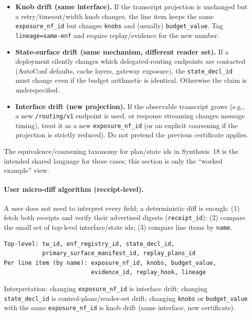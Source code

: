 \documentclass[11pt]{article}
\begin{document}
\begin{itemize}[leftmargin=*]
\item \textbf{Knob drift (same interface).} If the transcript projection is unchanged but a retry/timeout/width knob changes, the line item keeps the same \texttt{exposure\_nf\_id} but changes \texttt{knobs} and (usually) \texttt{budget\_value}. Tag \texttt{lineage=same-enf} and require replay/evidence for the new number.\cite{series:receiptitems,series:planstateequiv}
\item \textbf{State-surface drift (same mechanism, different reader set).} If a deployment silently changes which delegated-routing endpoints are contacted (AutoConf defaults, cache layers, gateway exposure), the \texttt{state\_decl\_id} must change even if the budget arithmetic is identical. Otherwise the claim is underspecified.\cite{series:deployedsurfaces,series:planstateequiv}
\item \textbf{Interface drift (new projection).} If the observable transcript grows (e.g., a new \texttt{/routing/v1} endpoint is used, or response streaming changes message timing), treat it as a new \texttt{exposure\_nf\_id} (or an explicit coarsening if the projection is strictly reduced). Do not pretend the previous certificate applies.\cite{series:traceifaces,series:receiptitems}
\end{itemize}

The equivalence/coarsening taxonomy for plan/state ids in Synthesis~18 is the intended shared language for these cases; this section is only the ``worked example'' view.\cite{series:planstateequiv}

\paragraph{User micro-diff algorithm (receipt-level).}
A user does not need to interpret every field; a deterministic diff is enough:
(1) fetch both receipts and verify their advertised digests (\texttt{receipt\_id});
(2) compare the small set of top-level interface/state ids;
(3) compare line items by \texttt{name}.
\begin{verbatim}
Top-level: tw_id, enf_registry_id, state_decl_id,
           primary_surface_manifest_id, replay_plans_id
Per line item (by name): exposure_nf_id, knobs, budget_value,
                         evidence_id, replay_hook, lineage
\end{verbatim}
Interpretation: changing \texttt{exposure\_nf\_id} is interface drift; changing \texttt{state\_decl\_id} is control-plane/reader-set drift; changing \texttt{knobs} or \texttt{budget\_value} with the same \texttt{exposure\_nf\_id} is knob drift (same interface, new certificate).
\end{document}
